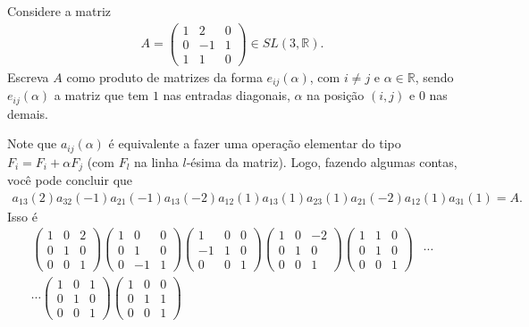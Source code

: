 \begin{homeworkProblem}
  Considere a matriz
  \begin{align*}
    A =\begin{pmatrix}
      1 & 2 & 0 \\
      0 & -1 & 1 \\
      1 & 1 & 0
    \end{pmatrix} \in SL(3,\mathbb{R}).
  \end{align*}
  Escreva $A$ como produto de matrizes da forma $e_{ij}(\alpha)$, com $i \neq j$ e $\alpha \in \mathbb{R}$, sendo $e_{ij}(\alpha)$ a matriz que tem $1$ nas entradas diagonais, $\alpha$ na posição $(i,j)$ e $0$ nas demais.
  \begin{solution}
    Note que $a_{ij}(\alpha)$ é equivalente a fazer uma operação elementar do tipo $F_i=F_i+\alpha F_j$ (com $F_l$ na linha $l$-ésima da matriz). Logo, fazendo algumas contas, você pode concluir que
    \begin{align*}
      a_{13}(2)a_{32}(-1)a_{21}(-1)a_{13}(-2)a_{12}(1)a_{13}(1)a_{23}(1)a_{21}(-2)a_{12}(1)a_{31}(1)=A.
    \end{align*}
    Isso é
    \begin{align*}
      \begin{pmatrix}1&0&2\\0&1&0\\0&0&1\end{pmatrix}
      \begin{pmatrix}1&0&0\\0&1&0\\0&-1&1\end{pmatrix}
      \begin{pmatrix}1&0&0\\-1&1&0\\0&0&1\end{pmatrix}
      \begin{pmatrix}1&0&-2\\0&1&0\\0&0&1\end{pmatrix}
      \begin{pmatrix}1&1&0\\0&1&0\\0&0&1\end{pmatrix}&\cdots\\
      \cdots \begin{pmatrix}1&0&1\\0&1&0\\0&0&1\end{pmatrix}
      \begin{pmatrix}1&0&0\\0&1&1\\0&0&1\end{pmatrix}

\end{align*}
\end{solution}
\end{homeworkProblem}
